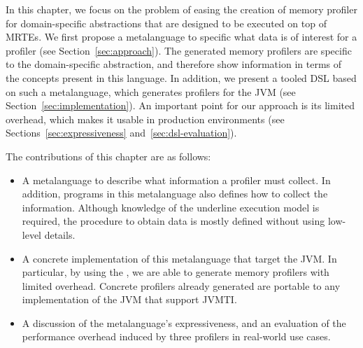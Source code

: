 In this chapter, we focus on the problem of easing the creation of memory profiler for domain-specific abstractions that are designed to be executed on top of MRTEs. 
We first propose a metalanguage to specific what data is of interest for a profiler (see Section~\ref{sec:approach}).
The generated memory profilers are specific to the domain-specific abstraction, and therefore show information in terms of the concepts present in this language. 
In addition, we present a tooled DSL based on such a metalanguage, which generates profilers for the JVM (see Section~\ref{sec:implementation}).
An important point for our approach is its limited overhead, which makes it usable in production environments (see Sections~\ref{sec:expressiveness} and~\ref{sec:dsl-evaluation}).

The contributions of this chapter are as follows:
\begin{itemize}
\item A metalanguage to describe what information a profiler must collect.
In addition, programs in this metalanguage also defines how to collect the information.
Although knowledge of the underline execution model is required, the procedure to obtain data is mostly defined without using low-level details.  

\item A concrete implementation of this metalanguage that target the JVM.
In particular, by using the , we are able to generate memory profilers with limited overhead.
Concrete profilers already generated are portable to any implementation of the JVM that support JVMTI.

\item A discussion of the metalanguage's expressiveness, and an evaluation of the performance overhead induced by three profilers in real-world use cases.
\end{itemize}

